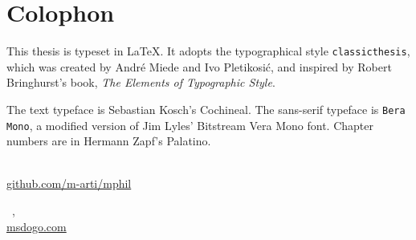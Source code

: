 \pagestyle{empty}

\hfill

\vfill

\section*{Colophon}

This thesis is typeset in \LaTeX. It adopts the typographical style \texttt{classicthesis}, which was created by Andr\'e Miede and Ivo Pletikosić, and inspired by Robert Bringhurst's book, \emph{The Elements of Typographic Style}.

The text typeface is Sebastian Kosch's Cochineal. The sans-serif typeface is \texttt{Bera Mono}, a modified version of Jim Lyles' Bitstream Vera Mono font. Chapter numbers are in Hermann Zapf's Palatino.

\bigskip \bigskip

\noindent \emph{\myTitleUnformatted} \\
\href{https://github.com/m-arti/mphil}{\url{github.com/m-arti/mphil}}

\medskip

\noindent\textcopyright\ \myTime, \myName \\
\href{https://msdogo.com}{\url{msdogo.com}}

\bigskip \bigskip \bigskip
